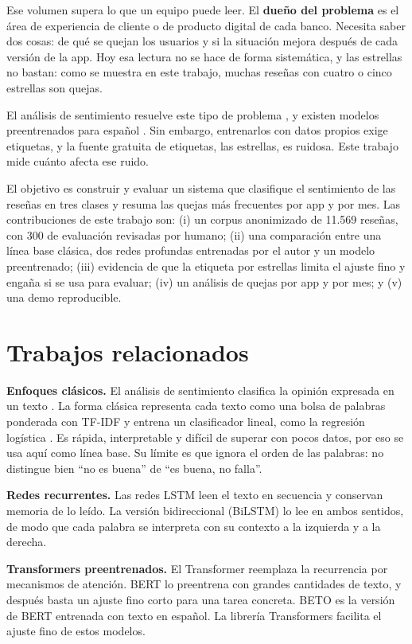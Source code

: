 \documentclass[conference]{IEEEtran}
\begin{document}
Ese volumen supera lo que un equipo puede leer. El \textbf{dueño del problema} es el área de experiencia de cliente
o de producto digital de cada banco. Necesita saber dos cosas: de qué se quejan los usuarios y si la situación mejora
después de cada versión de la app. Hoy esa lectura no se hace de forma sistemática, y las estrellas no bastan: como
se muestra en este trabajo, muchas reseñas con cuatro o cinco estrellas son quejas.

El análisis de sentimiento resuelve este tipo de problema \cite{liu2012sentiment}, y existen modelos preentrenados
para español \cite{canete2020beto,perez2021pysentimiento}. Sin embargo, entrenarlos con datos propios exige
etiquetas, y la fuente gratuita de etiquetas, las estrellas, es ruidosa. Este trabajo mide cuánto afecta ese ruido.

El objetivo es construir y evaluar un sistema que clasifique el sentimiento de las reseñas en tres clases y resuma
las quejas más frecuentes por app y por mes. Las contribuciones de este trabajo son: (i) un corpus anonimizado de 11.569 reseñas, con 300 de evaluación revisadas
por humano; (ii) una comparación entre una línea base clásica, dos redes profundas entrenadas por el autor y un modelo
preentrenado; (iii) evidencia de que la etiqueta por estrellas limita el ajuste fino y engaña si se usa para evaluar;
(iv) un análisis de quejas por app y por mes; y (v) una demo reproducible.

\section{Trabajos relacionados}
\textbf{Enfoques clásicos.} El análisis de sentimiento clasifica la opinión expresada en un texto
\cite{liu2012sentiment}. La forma clásica representa cada texto como una bolsa de palabras ponderada con TF-IDF y
entrena un clasificador lineal, como la regresión logística \cite{pedregosa2011sklearn}. Es rápida, interpretable
y difícil de superar con pocos datos, por eso se usa aquí como línea base. Su límite es que ignora el orden de las
palabras: no distingue bien ``no es buena'' de ``es buena, no falla''.

\textbf{Redes recurrentes.} Las redes LSTM \cite{hochreiter1997lstm} leen el texto en secuencia y conservan memoria
de lo leído. La versión bidireccional (BiLSTM) \cite{schuster1997bidirectional} lo lee en ambos sentidos, de modo que
cada palabra se interpreta con su contexto a la izquierda y a la derecha.

\textbf{Transformers preentrenados.} El Transformer \cite{vaswani2017attention} reemplaza la recurrencia por
mecanismos de atención. BERT \cite{devlin2019bert} lo preentrena con grandes cantidades de texto, y después basta un
ajuste fino corto para una tarea concreta. BETO \cite{canete2020beto} es la versión de BERT entrenada con texto en
español. La librería Transformers \cite{wolf2020transformers} facilita el ajuste fino de estos modelos.
\end{document}
